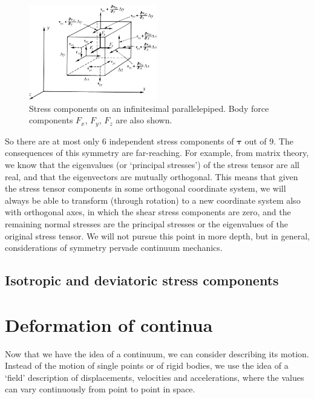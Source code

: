 \documentclass[a4paper,11pt]		{report}
\begin{document}
\begin{figure}
\begin{center}
\includegraphics[width=0.5\textwidth]{Fung-3.8.eps}
\end{center}
\caption{Stress components on an infinitesimal parallelepiped. Body
  force components $F_x$, $F_y$, $F_z$ are also shown.}
\label{fig.para}
\end{figure}

So there are at most only 6 independent stress components of
$\bm{\tau}$ out of 9. The consequences of this symmetry are
far-reaching. For example, from matrix theory, we know that the
eigenvalues (or `principal stresses') of the stress tensor are all
real, and that the eigenvectors are mutually orthogonal. This means
that given the stress tensor components in some orthogonal coordinate
system, we will always be able to transform (through rotation) to a
new coordinate system also with orthogonal axes, in which the shear
stress components are zero, and the remaining normal stresses are the
principal stresses or the eigenvalues of the original stress
tensor. We will not pursue this point in more depth, but in general,
considerations of symmetry pervade continuum mechanics.

\subsection{Isotropic and deviatoric stress components}

\section{Deformation of continua}

Now that we have the idea of a continuum, we can consider describing
its motion. Instead of the motion of single points or of rigid bodies,
we use the idea of a `field' description of displacements, velocities
and accelerations, where the values can vary continuously from point
to point in space.
\end{document}

